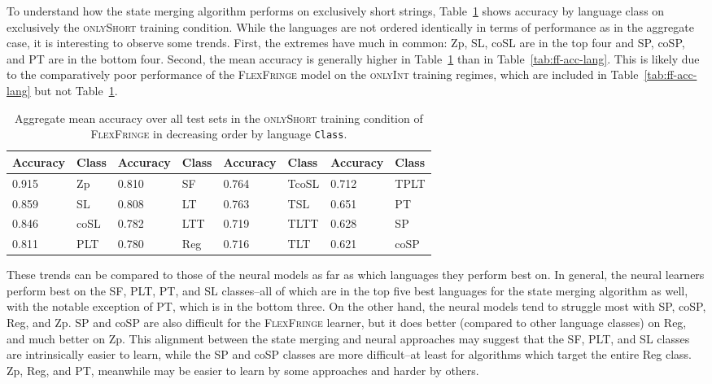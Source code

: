 \documentclass[twoside,11pt]{article}
\newcommand{\tscx}[1]{\textsc{#1}\xspace}
\newcommand{\ttt}[1]{\texttt{#1}}
\newcommand{\tttx}[1]{\ttt{#1}\xspace}
\newcommand{\Class}{\tttx{Class}}
\newcommand{\onlyShort}{\tscx{onlyShort}}
\newcommand{\onlyInt}{\tscx{onlyInt}}
\begin{document}
To understand how the state merging algorithm performs on exclusively short strings, Table~\ref{tab:ff-acc-lang-onlyshort} shows accuracy by language class on exclusively the \onlyShort training condition.
While the languages are not ordered identically in terms of performance as in the aggregate case, it is interesting to observe some trends.
First, the extremes have much in common: Zp, SL, coSL are in the top four and SP, coSP, and PT are in the bottom four.
Second, the mean accuracy is
generally higher in Table~\ref{tab:ff-acc-lang-onlyshort} than in
Table~\ref{tab:ff-acc-lang}.
This is likely due to the comparatively poor performance of the \textsc{FlexFringe} model on the \onlyInt training regimes, which are included in Table~\ref{tab:ff-acc-lang} but not Table~\ref{tab:ff-acc-lang-onlyshort}.

\begin{table}[t]
  \centering
  \begin{tabular}{ll|ll|ll|ll}
    \toprule
    Accuracy & Class & Accuracy & Class & Accuracy & Class & Accuracy & Class \\
    \midrule
    0.915    & Zp    & 0.810    & SF    & 0.764    & TcoSL & 0.712    & TPLT  \\
    0.859    & SL    & 0.808    & LT    & 0.763    & TSL   & 0.651    & PT    \\
    0.846    & coSL  & 0.782    & LTT   & 0.719    & TLTT  & 0.628    & SP    \\
    0.811    & PLT   & 0.780    & Reg   & 0.716    & TLT   & 0.621    & coSP  \\
    \bottomrule
  \end{tabular}
  \caption{Aggregate mean accuracy over all test sets in the \onlyShort training condition of \textsc{FlexFringe} in decreasing order by
    language \Class.}
  \label{tab:ff-acc-lang-onlyshort}
\end{table}

These trends can be compared to those of the neural models as far as which languages they perform best on. 
In general, the neural learners perform best on the SF, PLT, PT, and SL classes--all of which are in the top five best languages for the state merging algorithm as well, with the notable exception of PT, which is in the bottom three.
On the other hand, the neural models tend to struggle most with SP, coSP, Reg, and Zp.
SP and coSP are also difficult for the \textsc{FlexFringe} learner, but it does better (compared to other language classes) on Reg, and much better on Zp.
This alignment between the state merging and neural approaches may suggest that the SF, PLT, and SL classes are intrinsically easier to learn, while the SP and coSP classes are more difficult--at least for algorithms which target the entire Reg class.
Zp, Reg, and PT, meanwhile may be easier to learn by some approaches and harder by others.
\end{document}
